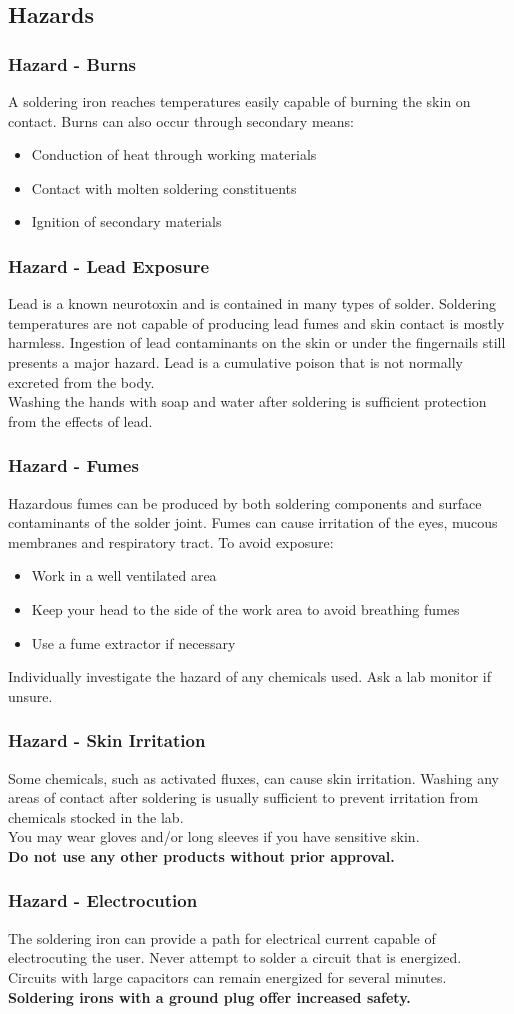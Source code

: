 \documentclass{beamer}
\begin{document}
\subsection{Hazards}
\begin{frame}[t]
	\frametitle{Hazard - Burns}
	A soldering iron reaches temperatures easily capable of burning the skin on contact.
	Burns can also occur through secondary means:
	\begin{itemize}
		\item Conduction of heat through working materials
		\item Contact with molten soldering constituents
		\item Ignition of secondary materials
	\end{itemize}
\end{frame}
\begin{frame}[t]
	\frametitle{Hazard - Lead Exposure}
	Lead is a known neurotoxin and is contained in many types of solder. Soldering temperatures are not capable of producing lead fumes and skin contact is mostly harmless. Ingestion of lead contaminants on the skin or under the fingernails still presents a major hazard. Lead is a cumulative poison that is not normally excreted from the body.\\
	Washing the hands with soap and water after soldering is sufficient protection from the effects of lead.
\end{frame}
\begin{frame}[t]
	\frametitle{Hazard - Fumes}
	Hazardous fumes can be produced by both soldering components and surface contaminants of the solder joint. Fumes can cause irritation of the eyes, mucous membranes and respiratory tract. To avoid exposure:
	\begin{itemize}
		\item Work in a well ventilated area
		\item Keep your head to the side of the work area to avoid breathing fumes
		\item Use a fume extractor if necessary
	\end{itemize}
	Individually investigate the hazard of any chemicals used. Ask a lab monitor if unsure.
\end{frame}
\begin{frame}[t]
	\frametitle{Hazard - Skin Irritation}
	Some chemicals, such as activated fluxes, can cause skin irritation. Washing any areas of contact after soldering is usually sufficient to prevent irritation from chemicals stocked in the lab.\\
	You may wear gloves and/or long sleeves if you have sensitive skin.\\
	\textbf{Do not use any other products without prior approval.}
\end{frame}
\begin{frame}[t]
	\frametitle{Hazard - Electrocution}
	The soldering iron can provide a path for electrical current capable of electrocuting 
	the user. Never attempt to solder a circuit that is energized. Circuits with large 
	capacitors can remain energized for several minutes.\\
	\textbf{Soldering irons with a ground plug offer increased safety.}
\end{frame}
\end{document}

